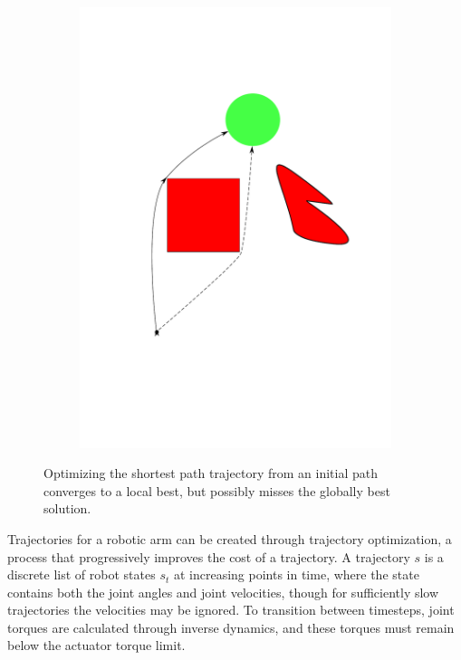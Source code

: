 \documentclass[../thesis.tex]{subfiles}
\begin{document}
\begin{figure}
\begin{subfigure}[b]{0.24\linewidth}
    \includegraphics[width=\linewidth]{./Planning/trajectory_best.pdf}    
  \end{subfigure}
  
  \caption{Optimizing the shortest path trajectory from an initial path converges to a local best, but possibly misses the globally best solution.}
  \label{fig:TrajectoryOptimization}
\end{figure}


Trajectories for a robotic arm can be created through trajectory optimization, a process that progressively improves the cost of a trajectory.
A trajectory $s$ is a discrete list of robot states $s_t$ at increasing points in time, where the state contains both the joint angles and joint velocities, though for sufficiently slow trajectories the velocities may be ignored.
To transition between timesteps, joint torques are calculated through inverse dynamics, and these torques must remain below the actuator torque limit.
\end{document}
